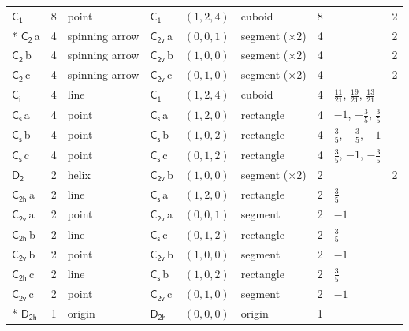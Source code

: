 \documentclass[10pt,a4paper]{article}
\numberwithin{equation}{section}
\newcommand{\grp}[1]{\mathsf{#1}}
\newcommand{\clsletter}[1]{\,{\scriptsize\color{black!55}#1}}
\newlength{\fillwidth}\newlength{\cellwidth}\newlength{\colwidth}
\begin{document}
{{\begin{longtable}{@{}lrllllr>{\RaggedRight\arraybackslash}p{\fillwidth}r@{}}
\href{C1.pdf}{$\grp{C_{1}}$} & 8 & point & \href{C1.pdf}{$\grp{C_{1}}$} & $(1, 2, 4)$ & cuboid & 8 &  & 2\\*
\href{C2.pdf}{$\grp{C_{2}}$}\clsletter{a} & 4 & spinning arrow & \href{C2v.pdf}{$\grp{C_{2v}}$}\clsletter{a} & $(0, 0, 1)$ & segment (${\times}2$) & 4 &  & 2\\
\href{C2.pdf}{$\grp{C_{2}}$}\clsletter{b} & 4 & spinning arrow & \href{C2v.pdf}{$\grp{C_{2v}}$}\clsletter{b} & $(1, 0, 0)$ & segment (${\times}2$) & 4 &  & 2\\
\href{C2.pdf}{$\grp{C_{2}}$}\clsletter{c} & 4 & spinning arrow & \href{C2v.pdf}{$\grp{C_{2v}}$}\clsletter{c} & $(0, 1, 0)$ & segment (${\times}2$) & 4 &  & 2\\
\href{S2.pdf}{$\grp{C_{i}}$} & 4 & line & \href{C1.pdf}{$\grp{C_{1}}$} & $(1, 2, 4)$ & cuboid & 4 & ${\tfrac{11}{21}}$, ${\tfrac{19}{21}}$, ${\tfrac{13}{21}}$ & \\
\href{C1v.pdf}{$\grp{C_{s}}$}\clsletter{a} & 4 & point & \href{C1v.pdf}{$\grp{C_{s}}$}\clsletter{a} & $(1, 2, 0)$ & rectangle & 4 & ${-1}$, ${-\tfrac{3}{5}}$, ${\tfrac{3}{5}}$ & \\
\href{C1v.pdf}{$\grp{C_{s}}$}\clsletter{b} & 4 & point & \href{C1v.pdf}{$\grp{C_{s}}$}\clsletter{b} & $(1, 0, 2)$ & rectangle & 4 & ${\tfrac{3}{5}}$, ${-\tfrac{3}{5}}$, ${-1}$ & \\
\href{C1v.pdf}{$\grp{C_{s}}$}\clsletter{c} & 4 & point & \href{C1v.pdf}{$\grp{C_{s}}$}\clsletter{c} & $(0, 1, 2)$ & rectangle & 4 & ${\tfrac{3}{5}}$, ${-1}$, ${-\tfrac{3}{5}}$ & \\
\href{D2.pdf}{$\grp{D_{2}}$} & 2 & helix & \href{C2v.pdf}{$\grp{C_{2v}}$}\clsletter{b} & $(1, 0, 0)$ & segment (${\times}2$) & 2 &  & 2\\
\href{C2h.pdf}{$\grp{C_{2h}}$}\clsletter{a} & 2 & line & \href{C1v.pdf}{$\grp{C_{s}}$}\clsletter{a} & $(1, 2, 0)$ & rectangle & 2 & ${\tfrac{3}{5}}$ & \\
\href{C2v.pdf}{$\grp{C_{2v}}$}\clsletter{a} & 2 & point & \href{C2v.pdf}{$\grp{C_{2v}}$}\clsletter{a} & $(0, 0, 1)$ & segment & 2 & ${-1}$ & \\
\href{C2h.pdf}{$\grp{C_{2h}}$}\clsletter{b} & 2 & line & \href{C1v.pdf}{$\grp{C_{s}}$}\clsletter{c} & $(0, 1, 2)$ & rectangle & 2 & ${\tfrac{3}{5}}$ & \\
\href{C2v.pdf}{$\grp{C_{2v}}$}\clsletter{b} & 2 & point & \href{C2v.pdf}{$\grp{C_{2v}}$}\clsletter{b} & $(1, 0, 0)$ & segment & 2 & ${-1}$ & \\
\href{C2h.pdf}{$\grp{C_{2h}}$}\clsletter{c} & 2 & line & \href{C1v.pdf}{$\grp{C_{s}}$}\clsletter{b} & $(1, 0, 2)$ & rectangle & 2 & ${\tfrac{3}{5}}$ & \\
\href{C2v.pdf}{$\grp{C_{2v}}$}\clsletter{c} & 2 & point & \href{C2v.pdf}{$\grp{C_{2v}}$}\clsletter{c} & $(0, 1, 0)$ & segment & 2 & ${-1}$ & \\*
\href{D2h.pdf}{$\grp{D_{2h}}$} & 1 & origin & \href{D2h.pdf}{$\grp{D_{2h}}$} & $(0, 0, 0)$ & origin & 1 &  & \\
\bottomrule\end{longtable}}}
\end{document}
